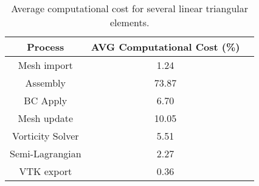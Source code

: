 \vspace{0.5cm}
\begin{table}[H]
\centering
\begin{tabular}{ccc}
\toprule
\textbf{Process} & \textbf{AVG Computational Cost} (\%) \\
\midrule
Mesh import & 1.24 \\
Assembly & 73.87 \\
BC Apply & 6.70 \\
Mesh update & 10.05 \\
Vorticity Solver & 5.51 \\
Semi-Lagrangian & 2.27 \\
VTK export & 0.36 \\
\bottomrule
\end{tabular}
\caption{Average computational cost for several linear triangular elements.}
\label{time ratio}
\end{table}



